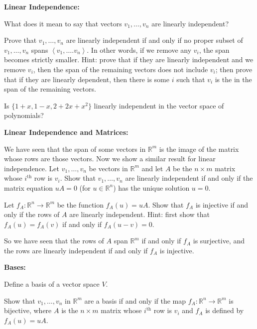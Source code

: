 \documentclass{article}
\newcommand{\SP}[1]{\left\langle #1 \right\rangle}
\begin{document}
\clearpage

\textbf{Linear Independence:}\bigskip


What does it mean to say that vectors $v_1,\hdots,v_n$ are linearly independent?

\vfill


Prove that $v_1,\hdots,v_n$ are linearly independent if and only if no proper subset of $v_1,\hdots,v_n$ spans $\SP{v_1,\hdots.v_n}$. In other words, if we remove any $v_i$, the span becomes strictly smaller. Hint: prove that if they are linearly independent and we remove $v_i$, then the span of the remaining vectors does not include $v_i$; then prove that if they are linearly dependent, then there is some $i$ such that $v_i$ is the in the span of the remaining vectors.

\vfill

Is $\{1+x,1-x,2+2x+x^2\}$ linearly independent in the vector space of polynomials?

\clearpage


\textbf{Linear Independence and Matrices:}\bigskip

We have seen that the span of some vectors in $\mathbb{R}^m$ is the image of the matrix whose rows are those vectors. Now we show a similar result for linear independence. Let $v_1,\hdots,v_n$ be vectors in $\mathbb{R}^m$ and let $A$ be the $n\times m$ matrix whose $i^\mathrm{th}$ row is $v_i$. Show that $v_1,\hdots,v_n$ are linearly independent if and only if the matrix equation $uA=0$ (for $u\in\mathbb{R}^n$) has the unique solution $u=0$.

\vfill

Let $f_A:\mathbb{R}^n\to\mathbb{R}^m$ be the function $f_A(u)=uA$. Show that $f_A$ is injective if and only if the rows of $A$ are linearly independent. Hint: first show that $f_A(u)=f_A(v)$ if and only if $f_A(u-v)=0$.

\vfill

So we have seen that the rows of $A$ span $\mathbb{R}^m$ if and only if $f_A$ is surjective, and the rows are linearly independent if and only if $f_A$ is injective.

\clearpage

\textbf{Bases:}\bigskip


Define a basis of a vector space $V$.
\vfill


Show that $v_1,\hdots,v_n$ in $\mathbb{R}^m$ are a basis if and only if the map $f_A:\mathbb{R}^n\to\mathbb{R}^m$ is bijective, where $A$ is the $n\times m$ matrix whose $i^\mathrm{th}$ row is $v_i$ and $f_A$ is defined by $f_A(u)=uA$.

\vfill
\end{document}
